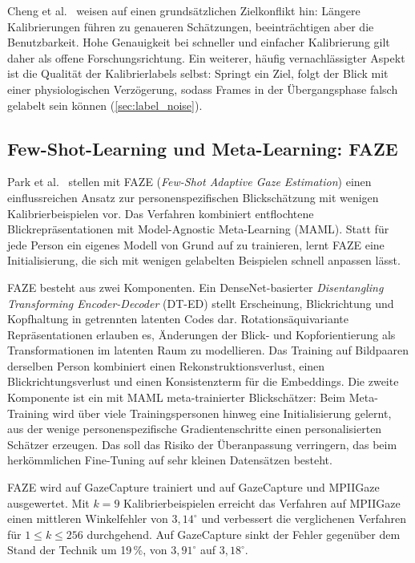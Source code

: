 \documentclass[
  11pt,
  a4paper,
  oneside,
  DIV=12,                 %
  BCOR=8mm,               %
  parskip=half,           %
  headings=normal,
  bibliography=totoc,     %
  listof=totoc            %
]{scrreprt}
\begin{document}
Cheng et al.~\cite{cheng2024review} weisen auf einen grundsätzlichen Zielkonflikt hin: Längere Kalibrierungen führen zu genaueren Schätzungen, beeinträchtigen aber die Benutzbarkeit. Hohe Genauigkeit bei schneller und einfacher Kalibrierung gilt daher als offene Forschungsrichtung. Ein weiterer, häufig vernachlässigter Aspekt ist die Qualität der Kalibrierlabels selbst: Springt ein Ziel, folgt der Blick mit einer physiologischen Verzögerung, sodass Frames in der Übergangsphase falsch gelabelt sein können (\cref{sec:label_noise}).

\subsection{Few-Shot-Learning und Meta-Learning: FAZE}
\label{subsec:faze}
Park et al.~\cite{park2019faze} stellen mit FAZE (\emph{Few-Shot Adaptive Gaze Estimation}) einen einflussreichen Ansatz zur personenspezifischen Blickschätzung mit wenigen Kalibrierbeispielen vor. Das Verfahren kombiniert entflochtene Blickrepräsentationen mit Model-Agnostic Meta-Learning (MAML). Statt für jede Person ein eigenes Modell von Grund auf zu trainieren, lernt FAZE eine Initialisierung, die sich mit wenigen gelabelten Beispielen schnell anpassen lässt.

FAZE besteht aus zwei Komponenten. Ein DenseNet-basierter \emph{Disentangling Transforming Encoder-Decoder} (DT-ED) stellt Erscheinung, Blickrichtung und Kopfhaltung in getrennten latenten Codes dar. Rotationsäquivariante Repräsentationen erlauben es, Änderungen der Blick- und Kopforientierung als Transformationen im latenten Raum zu modellieren. Das Training auf Bildpaaren derselben Person kombiniert einen Rekonstruktionsverlust, einen Blickrichtungsverlust und einen Konsistenzterm für die Embeddings. Die zweite Komponente ist ein mit MAML meta-trainierter Blickschätzer: Beim Meta-Training wird über viele Trainingspersonen hinweg eine Initialisierung gelernt, aus der wenige personenspezifische Gradientenschritte einen personalisierten Schätzer erzeugen. Das soll das Risiko der Überanpassung verringern, das beim herkömmlichen Fine-Tuning auf sehr kleinen Datensätzen besteht.

FAZE wird auf GazeCapture trainiert und auf GazeCapture und MPIIGaze ausgewertet. Mit $k = 9$ Kalibrierbeispielen erreicht das Verfahren auf MPIIGaze einen mittleren Winkelfehler von $3,14^\circ$ und verbessert die verglichenen Verfahren für $1 \le k \le 256$ durchgehend. Auf GazeCapture sinkt der Fehler gegenüber dem Stand der Technik um 19\,\%, von $3,91^\circ$ auf $3,18^\circ$.
\end{document}
